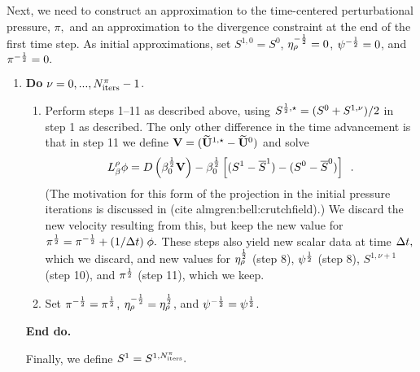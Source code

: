 Next, we need to construct an approximation to the time-centered perturbational pressure,
$\pi,$  and an approximation to the divergence constraint at the end of the
first time step.  As initial approximations, set $S^{1,0} = S^0$,
$\eta_{\rho}^{-\frac{1}{2}} = 0$, $\psi^{-\frac{1}{2}} = 0$, and $\pi^{-\frac{1}{2}} = 0.$
\begin{enumerate}
  \renewcommand{\theenumi}{{\bf \alph{enumi}}}
  \renewcommand{\labelenumii}{\roman{enumii}.}
  \addtocounter{enumi}{1}
  
\item {\bf Do} {$\nu = 0,...,N_{\rm iters}^{\pi}-1$.}
  
  \begin{enumerate}
  \item Perform steps 1--11 as described above, using 
    $S^{\frac{1}{2},\star} = (S^0 + S^{1,\nu})/2$ in step 1 as described.
    The only other difference in the time advancement is that in step 11
    we define ${\bf V} = (\widetilde{{\bf U}}^{1,\star} - \widetilde{{\bf U}}^0)$ and solve
    \begin{equation}  L_\beta^\rho \phi =
      D \left ( \beta_0^{\frac{1}{2}} {\bf V} \right) - \beta_0^{\frac{1}{2}} \left[ (S^{1}-\overline{S}^{1}) - (S^{0}-\overline{S}^{0}) \right] \enskip . 
    \end{equation}
    (The motivation for this form of the projection in the initial pressure iterations
    is discussed in (cite almgren:bell:crutchfield).)
      We discard the new velocity resulting from this, but keep the new  
      value for $\pi^{\frac{1}{2}} = \pi^{-\frac{1}{2}} + (1 / \Delta t) \; \phi.$  
      These steps also yield new scalar data at time $\Delta t,$ which
      we discard,  and new values for $\eta_{\rho}^{\frac{1}{2}}$ (step 8), $\psi^{\frac{1}{2}}$ (step 8), 
      $S^{1,\nu+1}$ (step 10), and $\pi^{\frac{1}{2}}$ (step 11), which we keep.
    \item Set $\pi^{-\frac{1}{2}} = \pi^{\frac{1}{2}}$, $\eta_{\rho}^{-\frac{1}{2}} = \eta_{\rho}^{\frac{1}{2}}$,
      and $\psi^{-\frac{1}{2}} = \psi^{\frac{1}{2}}$. 
    \end{enumerate}
    
    {\bf End do.}
    
    Finally, we define $S^1 = S^{1,N_{\rm iters}^\pi}.$
    
  \end{enumerate}

